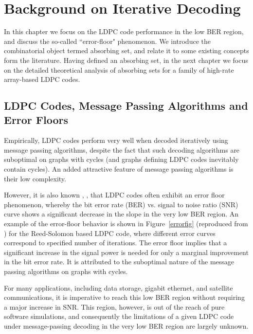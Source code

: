 \chapter[Background on Iterative Decoding]{Background on Iterative
Decoding}\label{iterativeBG}

In this chapter we focus on the LDPC code performance in the low BER
region, and discuss the so-called ``error-floor" phenomenon. We
introduce the combinatorial object termed absorbing set, and relate
it to some existing concepts form the literature. Having defined an
absorbing set, in the next chapter we focus on the detailed
theoretical analysis of absorbing sets for a family of high-rate
array-based LDPC codes.

\section{LDPC Codes, Message Passing Algorithms and Error Floors}

 Empirically,
LDPC codes perform very well when decoded iteratively using
message passing algorithms, despite the fact that such decoding
algorithms are suboptimal on graphs with cycles (and graphs
defining LDPC codes inevitably contain cycles). An added
attractive feature of message passing algorithms is their low
complexity.

However, it is also known \cite{mackay}, \cite{richardson}, that
LDPC codes often exhibit an error floor phenomenon, whereby the bit
error rate (BER) vs. signal to noise ratio (SNR) curve shows a
significant decrease in the slope in the very low BER region. An
example of the error-floor behavior is shown in
Figure~\ref{errorfig} (reproduced from \cite{zhang06}) for the
Reed-Solomon based LDPC code, where different error curves
correspond to specified number of iterations. The error floor
implies that a significant increase in the signal power is needed
for only a marginal improvement in the bit error rate. It is
attributed to the suboptimal nature of the message passing
algorithms on graphs with cycles.

For many applications, including data storage, gigabit ethernet, and
satellite communications, it is imperative to reach this low BER
region without requiring a major increase in SNR. This region,
however, is out of the reach of pure software simulations, and
consequently the limitations of a given LDPC code under
message-passing decoding in the very low BER region are largely
unknown.

